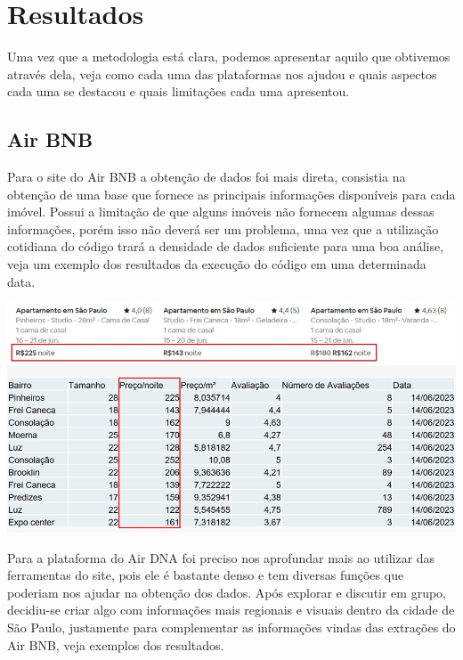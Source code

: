 \section*{Resultados}

Uma vez que a metodologia está clara, podemos apresentar aquilo que 
obtivemos através dela, veja como cada uma das plataformas nos ajudou e quais 
aspectos cada uma se destacou e quais limitações cada uma apresentou.

\subsection*{Air BNB}

Para o site do Air BNB a obtenção de dados foi mais direta, consistia 
na obtenção de uma base que fornece as principais informações disponíveis 
para cada imóvel. Possui a limitação de que alguns imóveis não fornecem
algumas dessas informações, porém isso não deverá ser um problema, uma 
vez que a utilização cotidiana do código trará a densidade de dados suficiente 
para uma boa análise, veja um exemplo dos resultados da execução do código 
em uma determinada data.

\bigskip

\includegraphics[width = .9\linewidth]{relatorios/lounge/imagens/img.jpg}

\bigskip

Para a plataforma do Air DNA foi preciso nos aprofundar mais ao 
utilizar das ferramentas do site, pois ele é bastante denso e tem diversas 
funções que poderiam nos ajudar na obtenção dos dados. Após explorar e 
discutir em grupo, decidiu-se criar algo com informações mais regionais e 
visuais dentro da cidade de São Paulo, justamente para complementar as 
informações vindas das extrações do Air BNB, veja exemplos dos resultados.

